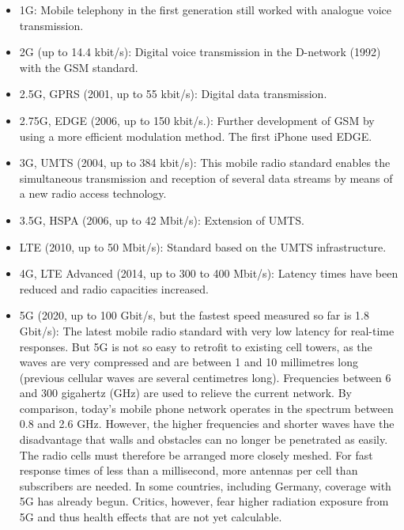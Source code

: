 \documentclass[
]{book}
\providecommand{\tightlist}{%
  \setlength{\itemsep}{0pt}\setlength{\parskip}{0pt}}
\begin{document}
\begin{itemize}
\tightlist
\item
  1G: Mobile telephony in the first generation still worked with analogue voice transmission.
\item
  2G (up to 14.4 kbit/s): Digital voice transmission in the D-network (1992) with the GSM standard.
\item
  2.5G, GPRS (2001, up to 55 kbit/s): Digital data transmission.
\item
  2.75G, EDGE (2006, up to 150 kbit/s.): Further development of GSM by using a more efficient modulation method. The first iPhone used EDGE.
\item
  3G, UMTS (2004, up to 384 kbit/s): This mobile radio standard enables the simultaneous transmission and reception of several data streams by means of a new radio access technology.
\item
  3.5G, HSPA (2006, up to 42 Mbit/s): Extension of UMTS.
\item
  LTE (2010, up to 50 Mbit/s): Standard based on the UMTS infrastructure.
\item
  4G, LTE Advanced (2014, up to 300 to 400 Mbit/s): Latency times have been reduced and radio capacities increased.
\item
  5G (2020, up to 100 Gbit/s, but the fastest speed measured so far is 1.8 Gbit/s): The latest mobile radio standard with very low latency for real-time responses. But 5G is not so easy to retrofit to existing cell towers, as the waves are very compressed and are between 1 and 10 millimetres long (previous cellular waves are several centimetres long). Frequencies between 6 and 300 gigahertz (GHz) are used to relieve the current network. By comparison, today's mobile phone network operates in the spectrum between 0.8 and 2.6 GHz. However, the higher frequencies and shorter waves have the disadvantage that walls and obstacles can no longer be penetrated as easily. The radio cells must therefore be arranged more closely meshed. For fast response times of less than a millisecond, more antennas per cell than subscribers are needed. In some countries, including Germany, coverage with 5G has already begun. Critics, however, fear higher radiation exposure from 5G and thus health effects that are not yet calculable.
\end{itemize}
\end{document}
